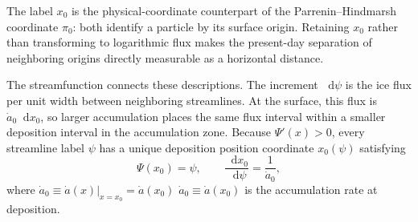 \documentclass[review]{igs}
\providecommand{\DIFadd}[1]{{\protect\color{blue} \sf #1}} %
\providecommand{\DIFdel}[1]{{\protect\color{red} \scriptsize #1}} %
\providecommand{\DIFaddbegin}{} %
\providecommand{\DIFaddend}{} %
\providecommand{\DIFdelbegin}{} %
\providecommand{\DIFdelend}{} %
\newcommand{\DIFscaledelfig}{0.5}
\newlength{\DIFdelgraphicswidth} %
\newlength{\DIFdelgraphicsheight} %
\newcommand{\DIFaddincludegraphics}[2][]{{\color{blue}\fbox{\DIFOincludegraphics[#1]{#2}}}} %
\newcommand{\DIFdelincludegraphics}[2][]{%
\sbox{\DIFdelgraphicsbox}{\DIFOincludegraphics[#1]{#2}}%
\settoboxwidth{\DIFdelgraphicswidth}{\DIFdelgraphicsbox} %
\settoboxtotalheight{\DIFdelgraphicsheight}{\DIFdelgraphicsbox} %
\scalebox{\DIFscaledelfig}{%
\parbox[b]{\DIFdelgraphicswidth}{\usebox{\DIFdelgraphicsbox}\\[-\baselineskip] \rule{\DIFdelgraphicswidth}{0em}}\llap{\resizebox{\DIFdelgraphicswidth}{\DIFdelgraphicsheight}{%
\setlength{\unitlength}{\DIFdelgraphicswidth}%
\begin{picture}(1,1)%
\thicklines\linethickness{2pt} %
{\color[rgb]{1,0,0}\put(0,0){\framebox(1,1){}}}%
{\color[rgb]{1,0,0}\put(0,0){\line( 1,1){1}}}%
{\color[rgb]{1,0,0}\put(0,1){\line(1,-1){1}}}%
\end{picture}%
}\hspace*{3pt}}} %
} %
\DeclareRobustCommand{\DIFaddbegin}{\DIFOaddbegin \let\includegraphics\DIFaddincludegraphics} %
\DeclareRobustCommand{\DIFaddend}{\DIFOaddend \let\includegraphics\DIFOincludegraphics} %
\DeclareRobustCommand{\DIFdelbegin}{\DIFOdelbegin \let\includegraphics\DIFdelincludegraphics} %
\DeclareRobustCommand{\DIFdelend}{\DIFOaddend \let\includegraphics\DIFOincludegraphics} %
\begin{document}
\DIFdel{The label \(x_0\) is the physical-coordinate counterpart of the Parrenin--Hindmarsh coordinate \(\pi_0\): both identify a particle by its surface origin. Retaining \(x_0\) rather than transforming to logarithmic flux makes the present-day separation of neighboring origins directly measurable as a horizontal distance.
}%

\DIFdel{The streamfunction connects these descriptions. The increment \(\mathop{}\!\mathrm{d}\psi\) is the ice flux per unit width between neighboring streamlines. At the surface, this flux is \(\dot a_0\mathop{}\!\mathrm{d} x_0\), so larger accumulation places the same flux interval within a smaller deposition interval}\DIFdelend \DIFaddbegin \DIFadd{in the accumulation zone}\DIFaddend . Because \(\Psi'(x)>0\), every streamline label \(\psi\) has a unique deposition \DIFdelbegin \DIFdel{position }\DIFdelend \DIFaddbegin \DIFadd{coordinate }\DIFaddend \(x_0(\psi)\) satisfying
\begin{equation}
\Psi(x_0)=\psi,
\qquad
\frac{\mathop{}\!\mathrm{d} x_0}{\mathop{}\!\mathrm{d}\psi}=\frac{1}{\dot a_0},
\label{eq:x0psi}
\end{equation}
where \DIFdelbegin \DIFdel{\(\dot a_0\equiv\left.\dot a(x)\right|_{x=x_0}=\dot a(x_0)\) }\DIFdelend \DIFaddbegin \DIFadd{\(\dot a_0\equiv\dot a(x_0)\) }\DIFaddend is the accumulation rate at deposition.
\end{document}
